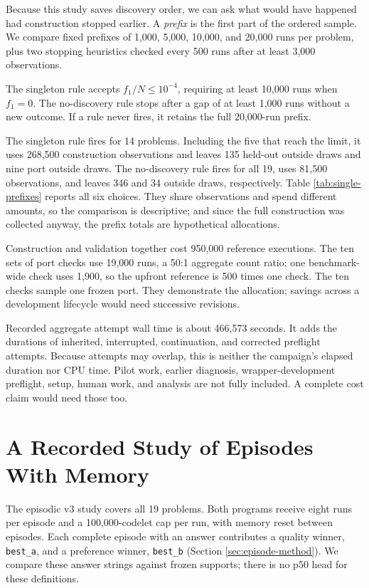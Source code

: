 \documentclass[10pt,letterpaper]{article}
\begin{document}
Because this study saves discovery order, we can ask what would have happened had
construction stopped earlier. A \emph{prefix} is the first part of the ordered sample. We
compare fixed prefixes of 1,000, 5,000, 10,000, and 20,000 runs per problem, plus two
stopping heuristics checked every 500 runs after at least 3,000 observations.

The singleton rule accepts \(f_1/N\le10^{-4}\), requiring at least 10,000 runs when
\(f_1=0\). The no-discovery rule stops after a gap of at least 1,000 runs without a new
outcome. If a rule never fires, it retains the full 20,000-run prefix.

The singleton rule fires for 14 problems. Including the five that reach the limit, it uses
268,500 construction observations and leaves 135 held-out outside draws and nine port
outside draws. The no-discovery rule fires for all 19, uses 81,500 observations, and
leaves 346 and 34 outside draws, respectively. Table \ref{tab:single-prefixes} reports all
six choices. They share observations and spend different amounts, so the comparison is
descriptive; and since the full construction was collected anyway, the prefix totals are
hypothetical allocations.

Construction and validation together cost 950,000 reference executions. The ten sets of
port checks use 19,000 runs, a 50:1 aggregate count ratio; one benchmark-wide check uses
1,900, so the upfront reference is 500 times one check. The ten checks sample one frozen
port. They demonstrate the allocation; savings across a development lifecycle would need
successive revisions.

Recorded aggregate attempt wall time is about 466,573 seconds. It adds the durations of
inherited, interrupted, continuation, and corrected preflight attempts. Because attempts
may overlap, this is neither the campaign's elapsed duration nor CPU time. Pilot work,
earlier diagnosis, wrapper-development preflight, setup, human work, and analysis are not
fully included. A complete cost claim would need those too.

\section{A Recorded Study of Episodes With Memory}\label{sec:episodic-coverage}

The episodic v3 study covers all 19 problems. Both programs receive eight runs per episode
and a 100,000-codelet cap per run, with memory reset between episodes. Each complete
episode with an answer contributes a quality winner, \texttt{best\_a}, and a preference
winner, \texttt{best\_b} (Section \ref{sec:episode-method}). We compare these answer
strings against frozen supports; there is no p50 head for these definitions.
\end{document}
